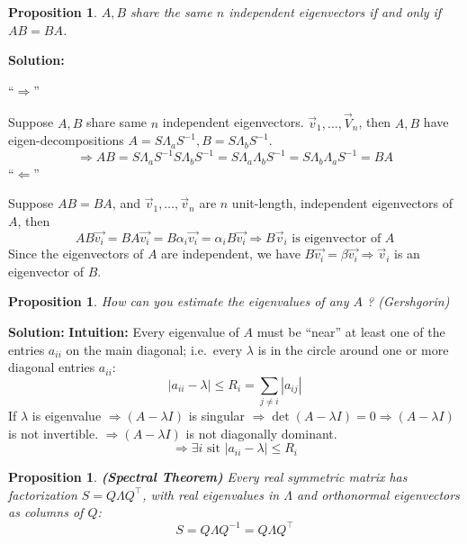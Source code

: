 \documentclass[14pt]{article}
\newtheorem{proposition}[theorem]{Proposition}
\theoremstyle{definition}
\newenvironment{solution}
{\color{C2}\begin{framed}\begingroup\textbf{Solution:} }
  {\endgroup\end{framed}}
\theoremstyle{remark}
\begin{document}
\begin{proposition}
    $A,B$ share the same $n$ independent eigenvectors if and only if $AB=BA$.
\end{proposition}
\begin{solution}

    ``$\Longrightarrow$''

    Suppose $A, B$ share same $n$ independent eigenvectors. $\vec{v}_1, \ldots, \vec{V}_n$, then $A, B$ have eigen-decompositions $A=S \Lambda_a S^{-1}, B=S \Lambda_b S^{-1}$.
    \[
        \Rightarrow A B=S \Lambda_a S^{-1} S \Lambda_b S^{-1}=S \Lambda_a \Lambda_b S^{-1}=S \Lambda_b \Lambda_a S^{-1}=B A
    \]
    ``$\Longleftarrow$''

    Suppose $A B=B A$, and $\vec{v}_1, \ldots, \vec{v}_n$ are $n$ unit-length, independent eigenvectors of $A$, then
    \[
        A B \overrightarrow{v_i}=B A \overrightarrow{v_i}=B \alpha_i \overrightarrow{v_i}=\alpha_i B \overrightarrow{v_i}\Rightarrow B \vec{v}_i \text{ is eigenvector of } A
    \]
    Since the eigenvectors of $A$ are independent, we have $B \overrightarrow{v_i}=\beta \overrightarrow{v_i} \Rightarrow \vec{v}_i$ is an eigenvector of $B$.
\end{solution}

\begin{proposition}
    How can you estimate the eigenvalues of any $A$ ? (Gershgorin)
\end{proposition}
\begin{solution}
    \textbf{Intuition:} Every eigenvalue of $A$ must be ``near'' at least one of the entries $a_{i i}$ on the main diagonal; i.e.\ every $\lambda$ is in the circle around one or more diagonal entries $a_{i i}$:
    $$
        \left|a_{ii}-\lambda\right| \leq R_i=\sum_{j \neq i}\left|a_{i j}\right|
    $$
    If $\lambda$ is eigenvalue $\Rightarrow(A-\lambda I)$ is singular
    $\Rightarrow \operatorname{\det}(A-\lambda I)=0 \Rightarrow(A-\lambda I)$ is not invertible.
    $\Rightarrow(A-\lambda I)$ is not diagonally dominant.
    $$
        \Rightarrow \exists i \text { sit }\left|a_{i i}-\lambda\right| \leq R_i
    $$
\end{solution}


\begin{proposition}
    \textbf{(Spectral Theorem)}
    Every real symmetric matrix has factorization $S = Q\Lambda Q^\top$, with real eigenvalues in $\Lambda$ and orthonormal eigenvectors as columns of $Q$:
    \[
        S = Q\Lambda Q^{-1} = Q\Lambda Q^\top
    \]
\end{proposition}
\end{document}
